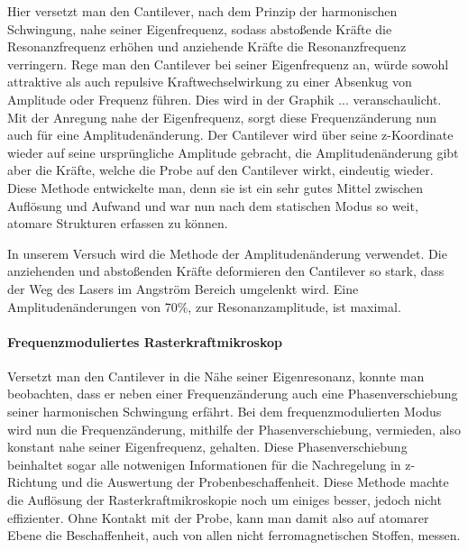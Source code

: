 Hier versetzt man den Cantilever, nach dem Prinzip der harmonischen Schwingung, nahe seiner Eigenfrequenz, sodass abstoßende Kräfte die Resonanzfrequenz erhöhen und anziehende Kräfte die Resonanzfrequenz verringern. 
Rege man den Cantilever bei seiner Eigenfrequenz an, würde sowohl attraktive als auch repulsive Kraftwechselwirkung zu einer Absenkug von Amplitude oder Frequenz führen. Dies wird in der Graphik ... veranschaulicht.
Mit der Anregung nahe der Eigenfrequenz, sorgt diese Frequenzänderung nun auch für eine Amplitudenänderung.
Der Cantilever wird über seine z-Koordinate wieder auf seine ursprüngliche Amplitude gebracht, die Amplitudenänderung gibt aber die Kräfte, welche die Probe auf den Cantilever wirkt, eindeutig wieder.
Diese Methode entwickelte man, denn sie ist ein sehr gutes Mittel zwischen Auflösung und Aufwand und war nun nach dem statischen Modus so weit, atomare Strukturen erfassen zu können.

 In unserem Versuch wird die Methode der Amplitudenänderung verwendet. 
Die anziehenden und abstoßenden Kräfte deformieren den Cantilever so stark, dass der Weg des Lasers im Angström Bereich umgelenkt wird. 
Eine Amplitudenänderungen von 70\%, zur Resonanzamplitude, ist maximal. 

       \paragraph{Frequenzmoduliertes Rasterkraftmikroskop}
       
Versetzt man den Cantilever in die Nähe seiner Eigenresonanz, konnte man beobachten, dass er neben einer Frequenzänderung auch eine Phasenverschiebung seiner harmonischen Schwingung erfährt.
Bei dem frequenzmodulierten Modus wird nun die Frequenzänderung, mithilfe der Phasenverschiebung, vermieden, also konstant nahe seiner Eigenfrequenz, gehalten.
Diese Phasenverschiebung beinhaltet sogar alle notwenigen Informationen für die Nachregelung in z-Richtung und die Auswertung der Probenbeschaffenheit.
Diese Methode machte die Auflösung der Rasterkraftmikroskopie noch um einiges besser, jedoch nicht effizienter.
Ohne Kontakt mit der Probe, kann man damit also auf atomarer Ebene die Beschaffenheit, auch von allen nicht ferromagnetischen Stoffen, messen.
 

